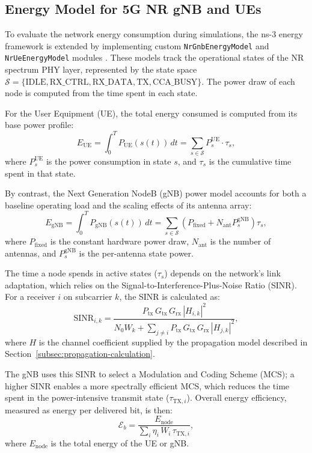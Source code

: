 \subsection{Energy Model for 5G NR gNB and UEs}

To evaluate the network energy consumption during simulations, the ns-3 energy framework is extended by implementing custom \texttt{NrGnbEnergyModel} and \texttt{NrUeEnergyModel} modules \cite{samorzewski_energy}.
These models track the operational states of the NR spectrum PHY layer, represented by
the state space $\mathcal{S} = \{\mathrm{IDLE}, \mathrm{RX\_CTRL}, \mathrm{RX\_DATA}, \mathrm{TX}, \mathrm{CCA\_BUSY}\}$.
The power draw of each node is computed from the time spent in each state.

For the User Equipment (UE), the total energy consumed is computed from its base power profile:
\begin{equation}
    E_\mathrm{UE} = \int_{0}^{T} P_\mathrm{UE}\!\left(s(t)\right)\, dt = \sum_{s \in \mathcal{S}} P_s^\mathrm{UE} \cdot \tau_s,
\end{equation}
where $P_s^\mathrm{UE}$ is the power consumption in state $s$, and $\tau_s$ is the cumulative time spent in that state.

By contrast, the Next Generation NodeB (gNB) power model accounts for both a baseline operating load and the scaling effects of its antenna array:
\begin{equation}
    E_\mathrm{gNB} = \int_{0}^{T} P_\mathrm{gNB}(s(t))\, dt = \sum_{s \in \mathcal{S}} (P_\mathrm{fixed} + N_\mathrm{ant} P_s^\mathrm{gNB}) \tau_s,
\end{equation}
where $P_\mathrm{fixed}$ is the constant hardware power draw, $N_\mathrm{ant}$ is the number of antennas, and $P_s^\mathrm{gNB}$ is the per-antenna state power.

The time a node spends in active states ($\tau_s$) depends on the network's link adaptation, which relies on the Signal-to-Interference-Plus-Noise Ratio (SINR).
For a receiver $i$ on subcarrier $k$, the SINR is calculated as:
\begin{equation}
    \mathrm{SINR}_{i,k} = \frac{P_\mathrm{tx}\, G_\mathrm{tx}\, G_\mathrm{rx}\, |H_{i,k}|^2}{N_0 W_k + \sum_{j \neq i} P_\mathrm{tx}\, G_\mathrm{tx}\, G_\mathrm{rx}\, |H_{j,k}|^2},
\end{equation}
where $H$ is the channel coefficient supplied by the propagation model described in Section~\ref{subsec:propagation-calculation}.

The gNB uses this SINR to select a Modulation and Coding Scheme (MCS); a higher SINR enables a more spectrally efficient MCS, which reduces the time spent in the power-intensive transmit state ($\tau_{\mathrm{TX},i}$).
Overall energy efficiency, measured as energy per delivered bit, is then:
\begin{equation}
    \mathcal{E}_b = \frac{E_\mathrm{node}}{\sum_i \eta_i\, W_i\, \tau_{\mathrm{TX},i}},
\end{equation}
where $E_\mathrm{node}$ is the total energy of the UE or gNB.

